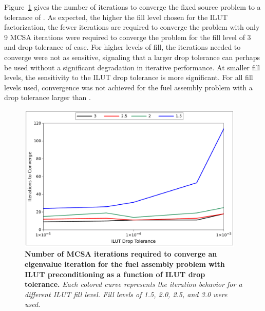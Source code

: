 Figure~\ref{fig:ilut_iterations} gives the number of iterations to
converge the fixed source problem to a tolerance of . As
expected, the higher the fill level chosen for the ILUT factorization,
the fewer iterations are required to converge the problem with only 9
MCSA iterations were required to converge the problem for the fill
level of 3 and drop tolerance of  case. For higher levels of
fill, the iterations needed to converge were not as sensitive,
signaling that a larger drop tolerance can perhaps be used without a
significant degradation in iterative performance. At smaller fill
levels, the sensitivity to the ILUT drop tolerance is more
significant. For all fill levels used, convergence was not achieved
for the fuel assembly problem with a drop tolerance larger than
.
\begin{figure}[t!]
  \begin{center}
    \includegraphics[width=4.25in]{chapters/spn_equations/ilut_iterations.pdf}
  \end{center}
  \caption{\textbf{Number of MCSA iterations required to converge an
      eigenvalue iteration for the fuel assembly problem with ILUT
      preconditioning as a function of ILUT drop tolerance.}
    \textit{Each colored curve represents the iteration behavior for a
      different ILUT fill level. Fill levels of 1.5, 2.0, 2.5, and 3.0
      were used.}}
  \label{fig:ilut_iterations}
\end{figure}

